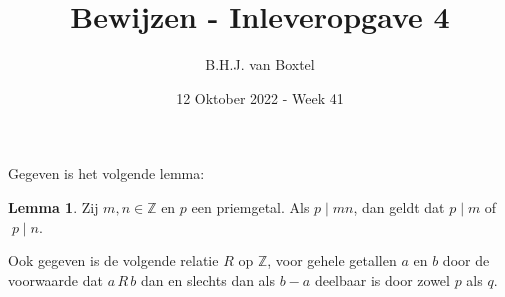 \documentclass[12pt, dutch, a4paper]{article}
\theoremstyle{definition}
\newtheorem{lemmalos}{Lemma}
\begin{document}
\title{Bewijzen - Inleveropgave 4}
\author{B.H.J. van Boxtel}
\date{12 Oktober 2022 - Week 41} 

\maketitle
{} 

Gegeven is het volgende lemma:
\begin{lemmalos}\label{lemma1}
    Zij $m,n \in \mathbb{Z}$ en $p$ een priemgetal. Als $p \mid mn$, 
    dan geldt dat $p \mid m$ of $\; p \mid n$.
\end{lemmalos}

Ook gegeven is de volgende relatie $R$ op $\mathbb{Z}$, 
voor gehele getallen $a$ en $b$ door de voorwaarde dat $a\,R\,b$ dan en slechts dan als
$b - a$ deelbaar is door zowel $p$ als $q$. \newline
\end{document}
